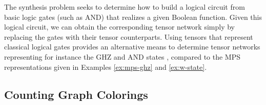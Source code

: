 \documentclass[aps,pra,12pt,nofootinbib,superscriptaddress,longbibliography]{revtex4-1}
\newcommand{\vb}[1]{}
\theoremstyle{plain}
\theoremstyle{definition}
\newtheorem{example}[theorem]{Example}
\begin{document}
%
%
%
%
%

The synthesis problem seeks to determine how to build a logical circuit from
basic logic gates (such as AND) that realizes a given Boolean function.
Given this logical circuit, we can obtain the corresponding tensor network
simply by replacing the gates with their tensor counterparts.
Using tensors that represent classical logical gates provides an alternative means to determine tensor networks representing for instance the GHZ and AND states \cite{CTNS}, compared to the MPS representations given in Examples \ref{ex:mps-ghz} and \ref{ex:w-state}.


\subsection[Penrose's tensor contraction algorithm]{Counting Graph Colorings} \label{sec:color}
\end{document}
